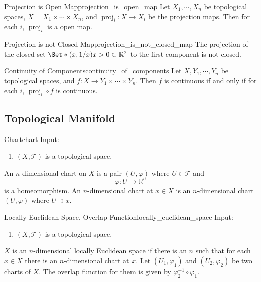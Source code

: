\documentclass{article}
\begin{document}
\begin{lemma}{Projection is Open Map}{projection_is_open_map}
    Let $X_1,\cdots,X_n$ be topological spaces, $X = X_1 \times \cdots \times X_n$, and $\operatorname{proj}_i: X \rightarrow X_i$ be the projection maps.
    Then for each $i$, $\operatorname{proj}_i$ is a open map.
\end{lemma}

\begin{counterexample}{Projection is not Closed Map}{projection_is_not_closed_map}
    The projection of the closed set $\Set*{(x,1/x)}{x>0}\subset \mathbb{R}^2$ to the first component is not closed.
\end{counterexample}

\begin{lemma}{Continuity of Components}{continuity_of_components}
    Let $X,Y_1,\cdots,Y_n$ be topological spaces, and $f:X\rightarrow Y_1 \times \cdots \times Y_n$.
    Then $f$ is continuous if and only if for each $i$, $\operatorname{proj}_i \circ f$ is continuous.
\end{lemma}

\subsection{Topological Manifold}

\begin{definition}{Chart}{chart}
    Input:
    \begin{enumerate}
        \item $(X,\mathcal{T})$ is a topological space.
    \end{enumerate}
    An $n$-dimensional chart on $X$ is a pair $(U,\varphi)$ where $U\in\mathcal{T}$ and
    \[ \varphi: U \rightarrow \mathbb{R}^n \]
    is a homeomorphism.
    An $n$-dimensional chart at $x\in X$ is an $n$-dimensional chart $(U,\varphi)$ where $U\supset x$.
\end{definition}

\begin{definition}{Locally Euclidean Space, Overlap Function}{locally_euclidean_space}
    Input:
    \begin{enumerate}
        \item $(X,\mathcal{T})$ is a topological space.
    \end{enumerate}
    $X$ is an $n$-dimensional locally Euclidean space if there is an $n$ such that for each $x\in X$ there is an $n$-dimensional chart at $x$.
    Let $(U_1,\varphi_1)$ and $(U_2,\varphi_2)$ be two charts of $X$.
    The overlap function for them is given by $\varphi_2^{-1}\circ \varphi_1$.
\end{definition}
\end{document}
